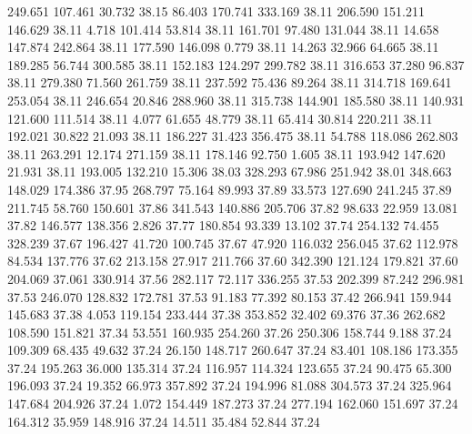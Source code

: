  249.651  107.461   30.732        38.15
  86.403  170.741  333.169        38.11
 206.590  151.211  146.629        38.11
   4.718  101.414   53.814        38.11
 161.701   97.480  131.044        38.11
  14.658  147.874  242.864        38.11
 177.590  146.098    0.779        38.11
  14.263   32.966   64.665        38.11
 189.285   56.744  300.585        38.11
 152.183  124.297  299.782        38.11
 316.653   37.280   96.837        38.11
 279.380   71.560  261.759        38.11
 237.592   75.436   89.264        38.11
 314.718  169.641  253.054        38.11
 246.654   20.846  288.960        38.11
 315.738  144.901  185.580        38.11
 140.931  121.600  111.514        38.11
   4.077   61.655   48.779        38.11
  65.414   30.814  220.211        38.11
 192.021   30.822   21.093        38.11
 186.227   31.423  356.475        38.11
  54.788  118.086  262.803        38.11
 263.291   12.174  271.159        38.11
 178.146   92.750    1.605        38.11
 193.942  147.620   21.931        38.11
 193.005  132.210   15.306        38.03
 328.293   67.986  251.942        38.01
 348.663  148.029  174.386        37.95
 268.797   75.164   89.993        37.89
  33.573  127.690  241.245        37.89
 211.745   58.760  150.601        37.86
 341.543  140.886  205.706        37.82
  98.633   22.959   13.081        37.82
 146.577  138.356    2.826        37.77
 180.854   93.339   13.102        37.74
 254.132   74.455  328.239        37.67
 196.427   41.720  100.745        37.67
  47.920  116.032  256.045        37.62
 112.978   84.534  137.776        37.62
 213.158   27.917  211.766        37.60
 342.390  121.124  179.821        37.60
 204.069   37.061  330.914        37.56
 282.117   72.117  336.255        37.53
 202.399   87.242  296.981        37.53
 246.070  128.832  172.781        37.53
  91.183   77.392   80.153        37.42
 266.941  159.944  145.683        37.38
   4.053  119.154  233.444        37.38
 353.852   32.402   69.376        37.36
 262.682  108.590  151.821        37.34
  53.551  160.935  254.260        37.26
 250.306  158.744    9.188        37.24
 109.309   68.435   49.632        37.24
  26.150  148.717  260.647        37.24
  83.401  108.186  173.355        37.24
 195.263   36.000  135.314        37.24
 116.957  114.324  123.655        37.24
  90.475   65.300  196.093        37.24
  19.352   66.973  357.892        37.24
 194.996   81.088  304.573        37.24
 325.964  147.684  204.926        37.24
   1.072  154.449  187.273        37.24
 277.194  162.060  151.697        37.24
 164.312   35.959  148.916        37.24
  14.511   35.484   52.844        37.24
